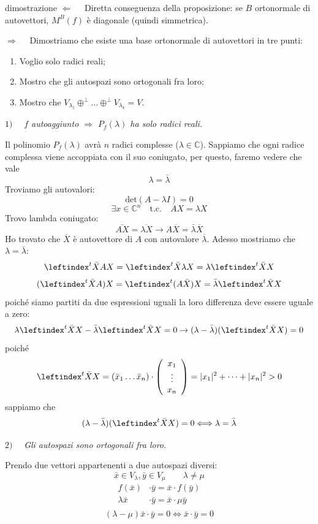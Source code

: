 \documentclass[x11names]{article}
\begin{document}
\begin{es}{dimostrazione}
$\Longleftarrow \quad$ Diretta conseguenza della proposizione: se $B$ ortonormale di autovettori, $M^B\left(f\right)$ è diagonale (quindi simmetrica). 

$\Longrightarrow \quad$ Dimostriamo che esiste una base ortonormale di autovettori in tre punti:
\begin{enumerate}
	\item Voglio solo radici reali;
	\item Mostro che gli autospazi sono ortogonali fra loro;
	\item Mostro che $V_{\lambda_{1}} \oplus^\perp \dots \oplus^\perp V_{\lambda_{k}} = V$.
\end{enumerate} 

$1) \quad$ \textit{$f$ autoaggiunto $\Longrightarrow$ $P_{f}(\lambda)$ ha solo radici reali.} 

Il polinomio $P_{f}(\lambda)$ avrà $n$ radici complesse ($\lambda \in \mathbb{C}$). Sappiamo che ogni radice complessa viene accoppiata con il suo coniugato, per questo, faremo vedere che vale
\[
\lambda = \bar{\lambda} 
\]
Troviamo gli autovalori:
\[
\text{det}\left(A - \lambda I\right) = 0 
\]
\[
\exists x \in \mathbb{C}^n \quad \text{t.c.} \quad AX = \lambda X
\]
Trovo lambda coniugato:
\[
\bar{AX} = \overline{\lambda X} \to A\overline{X} = \bar{\lambda} \overline{X}
\]
Ho trovato che $\overline{X}$ è autovettore di $A$ con autovalore $\overline{\lambda}$. Adesso mostriamo che $\lambda = \overline{\lambda}$:
\[
\leftindex^{t}{\bar{X}}AX = \leftindex^{t}{\bar{X}} \lambda X = \lambda \leftindex^{t}{\bar{X}}  X
\]
\[
(\leftindex^{t}{\bar{X}}A)X = \leftindex^{t}{(A\bar{X})}X = \bar{\lambda} \leftindex^{t}{\bar{X}} X
\]
poiché siamo partiti da due espressioni uguali la loro differenza deve essere uguale a zero:
\[
\lambda \leftindex^{t}{\bar{X}}  X -  \bar{\lambda} \leftindex^{t}{\bar{X}} X = 0 \to (\lambda - \bar{\lambda})(\leftindex^{t}{\bar{X}} X) = 0
\]
poiché
\[
\leftindex^{t}{\bar{X}} X = (\bar{x}_{1} \dots \bar{x}_{n}) \cdot \left(\begin{array}{c}
	x_{1} \\ \vdots \\ x_{n}
\end{array}\right)
= |x_{1}|^2 + \dots + |x_{n}|^2 > 0
\]
sappiamo che 
\[
(\lambda - \bar{\lambda})(\leftindex^{t}{\bar{X}} X) = 0 \Longleftrightarrow \lambda = \bar{\lambda}
\]

$2) \quad$ \textit{Gli autospazi sono ortogonali fra loro}.

Prendo due vettori appartenenti a due autospazi diversi:
\[
\bar{x} \in V_{\lambda}, \bar{y} \in V_{\mu} \qquad \lambda \neq \mu
\]
\begin{align*}
	f(\bar{x})& \cdot \bar{y} = \bar{x}\cdot f(\bar{y}) \\
	\lambda \bar{x}& \cdot \bar{y} = \bar{x} \cdot \mu \bar{y} \\
\end{align*}
\[
(\lambda - \mu)\bar{x} \cdot \bar{y} = 0 \Longleftrightarrow \bar{x} \cdot \bar{y} = 0
\]
\\
\end{es}
\end{document}
